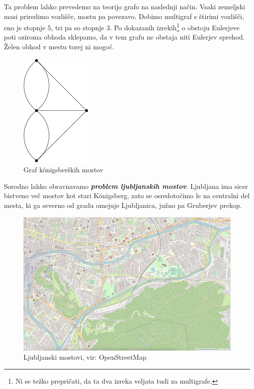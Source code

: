 \documentclass[11pt]{book}
\def\definicija{\color{rdeca}\bf\em}
\theoremstyle{definition}
\theoremstyle{zgled}
\theoremstyle{odprtproblem}
\theoremstyle{domacanaloga}
\theoremstyle{izrek}
\begin{document}
Ta problem lahko prevedemo na teorijo grafo na naslednji način. Vsaki zemeljski masi priredimo vozlišče, mostu pa povezavo. Dobimo multigraf s štirimi vozlišči, eno je stopnje $5$, tri pa so stopnje $3$. Po dokazanih izrekih\footnote{Ni se težko prepričati, da ta dva izreka veljata tudi za multigrafe.} o obstoju Eulerjeve poti oziroma obhoda sklepamo, da v tem grafu ne obstaja niti Eulerjev sprehod. Želen obhod v mestu torej ni mogoč. 

\begin{figure}[h]
    \centering
    \includegraphics[width=0.25\linewidth]{img/grafi-konigsberg.png}
    \caption{Graf königsberških mostov}
\end{figure}    

Sorodno lahko obravnavamo {\definicija problem ljubljanskih mostov}. Ljubljana ima sicer bistveno več mostov kot stari Königsberg, zato se osredotočimo le na centralni del mesta, ki ga severno od gradu omejuje Ljubljanica, južno pa Gruberjev prekop.

\begin{figure}[h]
    \centering
    \includegraphics[width=1\linewidth]{img/ljubljana.png}
    \caption{Ljubljanski mostovi, vir: OpenStreetMap}
\end{figure}    
\end{document}
